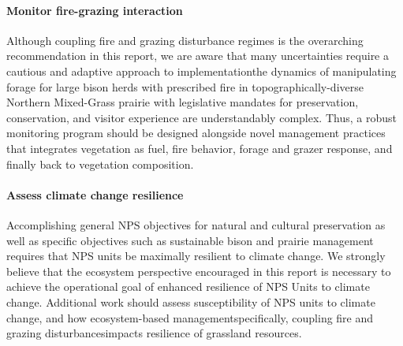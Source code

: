 \paragraph{Monitor fire-grazing interaction} 

Although coupling fire and grazing disturbance regimes is the overarching recommendation in this report, we are aware that many uncertainties require a cautious and adaptive approach to implementation\textemdash the dynamics of manipulating forage for large bison herds with prescribed fire in topographically-diverse Northern Mixed-Grass prairie with legislative mandates for preservation, conservation, and visitor experience are understandably complex. 
Thus, a robust monitoring program should be designed alongside novel management practices that integrates vegetation as fuel, fire behavior, forage and grazer response, and finally back to vegetation composition. 

\paragraph{Assess climate change resilience} 

Accomplishing general NPS objectives for natural and cultural preservation as well as specific objectives such as sustainable bison and prairie management requires that NPS units be maximally resilient to climate change. 
We strongly believe that the ecosystem perspective encouraged in this report is necessary to achieve the operational goal of enhanced resilience of NPS Units to climate change.  
Additional work should assess susceptibility of NPS units to climate change, and how ecosystem-based management\textemdash specifically, coupling fire and grazing disturbances\textemdash impacts resilience of grassland resources. 

